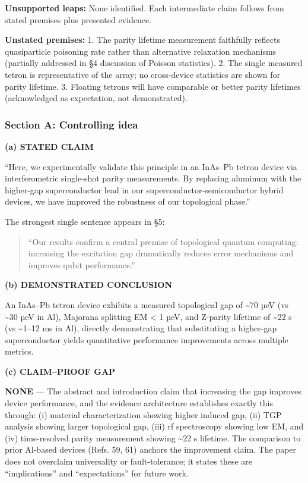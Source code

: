 \documentclass[10pt,letterpaper]{article}
\begin{document}
\textbf{Unsupported leaps:} None identified. Each intermediate claim follows from stated premises plus presented evidence.

\textbf{Unstated premises:}
1. The parity lifetime measurement faithfully reflects quasiparticle poisoning rate rather than alternative relaxation mechanisms (partially addressed in §4 discussion of Poisson statistics).
2. The single measured tetron is representative of the array; no cross-device statistics are shown for parity lifetime.
3. Floating tetrons will have comparable or better parity lifetimes (acknowledged as expectation, not demonstrated).

\hypertarget{section-a-controlling-idea}{%
\subsubsection{Section A: Controlling idea}\label{section-a-controlling-idea}}

\textbf{(a) STATED CLAIM}

``Here, we experimentally validate this principle in an InAs--Pb tetron device via interferometric single-shot parity measurements. By replacing aluminum with the higher-gap superconductor lead in our superconductor-semiconductor hybrid devices, we have improved the robustness of our topological phase.''

The strongest single sentence appears in §5:

\begin{quote}
``Our results confirm a central premise of topological quantum computing: increasing the excitation gap dramatically reduces error mechanisms and improves qubit performance.''
\end{quote}

\textbf{(b) DEMONSTRATED CONCLUSION}

An InAs--Pb tetron device exhibits a measured topological gap of \textasciitilde70 µeV (vs \textasciitilde30 µeV in Al), Majorana splitting EM \textless{} 1 µeV, and Z-parity lifetime of \textasciitilde22 s (vs \textasciitilde1--12 ms in Al), directly demonstrating that substituting a higher-gap superconductor yields quantitative performance improvements across multiple metrics.

\textbf{(c) CLAIM--PROOF GAP}

\textbf{NONE} --- The abstract and introduction claim that increasing the gap improves device performance, and the evidence architecture establishes exactly this through: (i) material characterization showing higher induced gap, (ii) TGP analysis showing larger topological gap, (iii) rf spectroscopy showing low EM, and (iv) time-resolved parity measurement showing \textasciitilde22 s lifetime. The comparison to prior Al-based devices (Refs. 59, 61) anchors the improvement claim. The paper does not overclaim universality or fault-tolerance; it states these are ``implications'' and ``expectations'' for future work.
\end{document}
